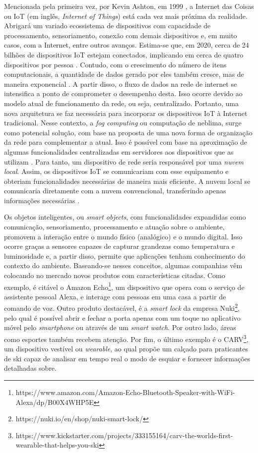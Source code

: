 Mencionada pela primeira vez, por Kevin Ashton, em 1999 \cite{Ashton2009}, a Internet das Coisas ou IoT (em inglês, \textit{Internet of Things}) está cada vez mais próxima da realidade. Abrigará um variado ecossistema de dispositivos com capacidade de processamento, sensoriamento, conexão com demais dispositivos e, em muito casos, com a Internet, entre outros avanços. Estima-se que, em 2020, cerca de 24 bilhões de dispositivos IoT estejam conectados, implicando em cerca de quatro dispositivos por pessoa \cite{Meola2016}.   
Contudo, com o crescimento do número de itens computacionais, a quantidade de dados gerado por eles também cresce, mas de maneira exponencial \cite{Chiang2016}. A partir disso, o fluxo de dados na rede de internet se intensifica a ponto de comprometer o desempenho desta. Isso ocorre devido ao modelo atual de funcionamento da rede, ou seja, centralizado. Portanto, uma nova arquitetura se faz necessária para incorporar os dispositivos IoT à Internet tradicional. %
Nesse contexto, a \textit{fog computing} ou computação de neblima, surge como potencial solução, com base na proposta de uma nova forma de organização da rede para complementar a atual. Isso é possível com base na aproximação de algumas funcionalidades centralizadas em servidores aos dispositivos que as utilizam \cite{Chiang2016}. Para tanto, um dispositivo de rede seria responsável por uma \textit{nuvem local}. Assim, os dispositivos IoT se comunicariam com esse equipamento e obteriam funcionalidades necessárias de maneira mais eficiente. A nuvem local se comunicaria diretamente com a nuvem convencional, transferindo apenas informações necessárias \cite{Syed2016}.

Os objetos inteligentes, ou \textit{smart objects}, com funcionalidades expandidas como comunicação, sensoriamento, processamento e atuação sobre o ambiente, promovem a interação entre o mundo físico (analógico) e o mundo digital\cite{Stojkoska2017}. Isso ocorre graças a sensores capazes de capturar grandezas como temperatura e luminosidade e, a partir disso, permite que aplicações tenham conhecimento do contexto do ambiente. Baseando-se nesses conceitos, algumas companhias vêm colocando no mercado novos produtos com características citadas. Como exemplo, é citável o Amazon Echo\textsuperscript{\textregistered}\footnote{https://www.amazon.com/Amazon-Echo-Bluetooth-Speaker-with-WiFi-Alexa/dp/B00X4WHP5E}, um dispositivo que opera com o serviço de assistente pessoal Alexa, e interage com pessoas em uma casa a partir de comando de voz. Outro produto destacável, é a \textit{smart lock} da empresa Nuki\textsuperscript{\textregistered}\footnote{https://nuki.io/en/shop/nuki-smart-lock/}, pelo qual é possível abrir e fechar a porta apenas com um toque no aplicativo móvel pelo \textit{smartphone} ou através de um \textit{smart watch}. Por outro lado, áreas como esportes também recebem atenção. Por fim, o último exemplo é o CARV\textsuperscript{\textregistered}\footnote{https://www.kickstarter.com/projects/333155164/carv-the-worlds-first-wearable-that-helps-you-ski}, um dispositivo vestível ou \textit{wearable}, ao qual propõe um calçado para praticantes de ski capaz de analisar em tempo real o modo de esquiar e fornecer informações detalhadas sobre.

